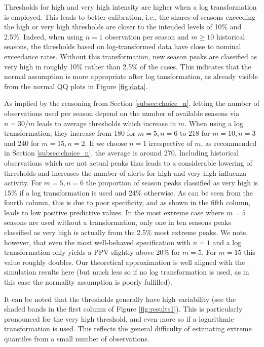 \documentclass[12pt]{article}
\begin{document}
Thresholds for high and very high intensity are higher when a log transformation is employed. This leads to better calibration, i.e., the shares of seasons exceeding the high or very high thresholds are closer to the intended levels of 10\% and 2.5\%. Indeed, when using $n = 1$ observation per season and $m \geq 10$ historical seasons, the thresholds based on log-transformed data have close to nominal exceedance rates. Without this transformation, new season peaks are classified as very high in roughly 10\% rather than 2.5\% of the cases. This indicates that the normal assumption is more appropriate after log tansformation, as already visible from the normal QQ plots in Figure \ref{fig:data}.

As implied by the reasoning from Section \ref{subsec:choice_n}, letting the number of observations used per season depend on the number of available seasons via $n = 30/m$ leads to average thresholds which increase in $m$. When using a log transformation, they increase from 180 for $m = 5, n = 6$ to 218 for $m = 10, n = 3$ and 240 for $m = 15, n = 2$. If we choose $n = 1$ irrespective of $m$, as recommended in Section \ref{subsec:choice_n}, the average is around 270. Including historical observations which are not actual peaks thus leads to a considerable lowering of thresholds and increases the number of alerts for high and very high influenza activity. For $m = 5, n = 6$ the proportion of season peaks classified as very high is 15\% if a log transformation is used and 24\% otherwise. As can be seen from the fourth column, this is due to poor specificity, and as shown in the fifth column, leads to low positive predictive values. In the most extreme case where $m = 5$ seasons are used without a transformation, only one in ten seasons peaks classified as very high is actually from the 2.5\% most extreme peaks. We note, however, that even the most well-behaved specification with $n = 1$ and a log transformation only yields a PPV slightly above 20\% for $m = 5$. For $m = 15$ this value roughly doubles. Our theoretical approximation is well aligned with the simulation results here (but much less so if no log transformation is used, as in this case the normality assumption is poorly fulfilled).


It can be noted that the thresholds generally have high variability (see the shaded bands in the first column of Figure \ref{fig:results1}). This is particularly pronounced for the very high threshold, and even more so if a logarithmic transformation is used. This reflects the general difficulty of estimating extreme quantiles from a small number of observations.
\end{document}
